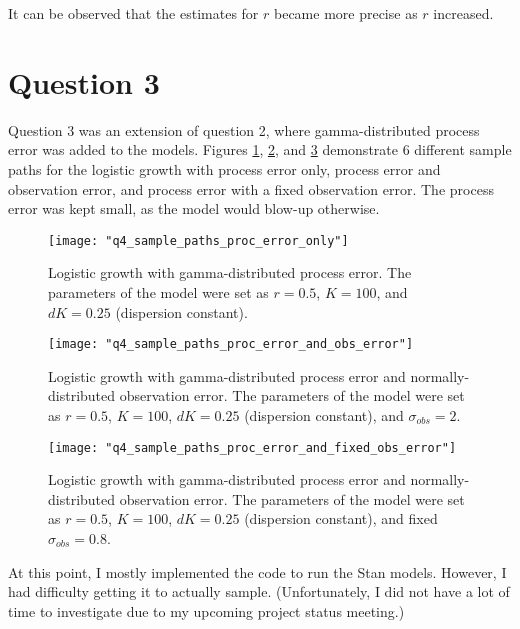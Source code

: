 \documentclass{article}[12 pt]
\begin{document}
\noindent
It can be observed that the estimates for $r$ became more precise as $r$ increased.

\newpage
\section*{Question 3}
Question 3 was an extension of question 2, where gamma-distributed process error was added to the models.  Figures \ref{fig:q4_sample_paths_proc_error_only}, \ref{fig:q4_sample_paths_proc_error_and_obs_error}, and \ref{fig:q4_sample_paths_proc_error_and_fixed_obs_error} demonstrate 6 different sample paths for the logistic growth with process error only, process error and observation error, and process error with a fixed observation error.  The process error was kept small, as the model would blow-up otherwise.
  
\begin{center}
	\begin{figure}[H]
		\centering
		\texttt{[image: "q4\_sample\_paths\_proc\_error\_only"]}
		\caption{Logistic growth with gamma-distributed process error.  The parameters of the model were set as $r=0.5$, $K=100$, and $dK=0.25$ (dispersion constant).}
		\label{fig:q4_sample_paths_proc_error_only}
	\end{figure}
\end{center}

\begin{center}
	\begin{figure}[H]
		\centering
		\texttt{[image: "q4\_sample\_paths\_proc\_error\_and\_obs\_error"]}
		\caption{Logistic growth with gamma-distributed process error and normally-distributed observation error.  The parameters of the model were set as $r=0.5$, $K=100$, $dK=0.25$ (dispersion constant), and $\sigma_{obs}=2$.}
		\label{fig:q4_sample_paths_proc_error_and_obs_error}
	\end{figure}
\end{center}

\begin{center}
	\begin{figure}[H]
		\centering
		\texttt{[image: "q4\_sample\_paths\_proc\_error\_and\_fixed\_obs\_error"]}
		\caption{Logistic growth with gamma-distributed process error and normally-distributed observation error.  The parameters of the model were set as $r=0.5$, $K=100$, $dK=0.25$ (dispersion constant), and fixed $\sigma_{obs}=0.8$.}
		\label{fig:q4_sample_paths_proc_error_and_fixed_obs_error}
	\end{figure}
\end{center}

\noindent
At this point, I mostly implemented the code to run the Stan models.  However, I had difficulty getting it to actually sample.  (Unfortunately, I did not have a lot of time to investigate due to my upcoming project status meeting.)
\end{document}
